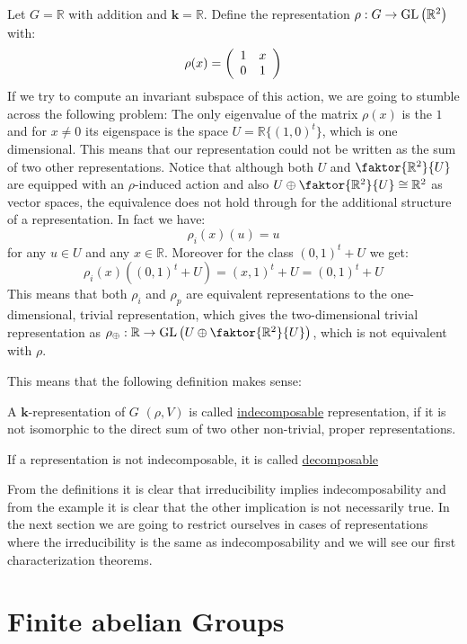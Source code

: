\begin{example} Let $G=\mathbb{R}$ with addition and $\mathbf{k}=\mathbb{R}$. Define the representation $\rho:G\to\GL{\mathbb{R}^2}$ with:
$$\rho(x)=\twocols{1}{0}{x}{1}$$
If we try to compute an invariant subspace of this action, we are going to stumble across the following problem: The only eigenvalue of the matrix $\rho(x)$ is the $1$ and for $x\neq0$ its eigenspace is the space $U=\mathbb{R}\{(1,0)^t\}$, which is one dimensional. This means that our representation could not be written as the sum of two other representations. Notice that although both $U$ and $\faktor{\mathbb{R}^2}{U}$ are equipped with an $\rho$-induced action and also $U\oplus\faktor{\mathbb{R}^2}{U}\cong\mathbb{R}^2$ as vector spaces, the equivalence does not hold through for the additional structure of a representation. In fact we have:
$$\rho_i(x)(u)=u$$
for any $u\in U$ and any $x\in\mathbb{R}$. Moreover for the class $(0,1)^t+U$ we get: 
$$\rho_i(x)((0,1)^t+U)=(x,1)^t+U=(0,1)^t+U$$
This means that both $\rho_i$ and $\rho_p$ are equivalent representations to the one-dimensional, trivial representation, which gives the two-dimensional trivial representation as $\rho_{\oplus}:\mathbb{R}\to\GL{U\oplus\faktor{\mathbb{R}^2}{U}}$, which is not equivalent with $\rho$.
\end{example}

This means that the following definition makes sense:

\begin{definition} A $\mathbf{k}$-representation of $G$ $(\rho,V)$ is called \ul{indecomposable} representation, if it is not isomorphic to the direct sum of two other non-trivial, proper representations.

If a representation is not indecomposable, it is called \ul{decomposable}
\end{definition}

From the definitions it is clear that irreducibility implies indecomposability and from the example it is clear that the other implication is not necessarily true. In the next section we are going to restrict ourselves in cases of representations where the irreducibility is the same as indecomposability and we will see our first characterization theorems.

\chapter{Finite abelian Groups}








